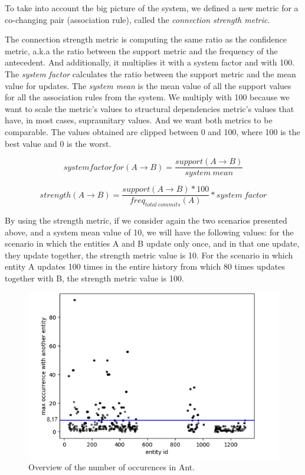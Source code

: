 \documentclass[runningheads]{comsis2}
\begin{document}
To take into account the big picture of the system, we defined a new metric for a co-changing pair (association rule), called the \textit{connection strength metric}. 

The connection strength metric is computing the same ratio as the confidence metric, a.k.a the ratio between the support metric and the frequency of the antecedent. And additionally, it multiplies it with a system factor and with 100. 
The \textit{system factor} calculates the ratio between the support metric and the mean value for updates. The \textit{system mean} is the mean value of all the support values for all the association rules from the system. 
We multiply with 100 because we want to scale the metric's values to structural dependencies metric's values that have, in most cases, supraunitary values. And we want both metrics to be comparable. The values obtained are clipped between 0 and 100, where 100 is the best value and 0 is the worst.



\begin{equation}
 system factor for (A \rightarrow B) =\frac{support (A \rightarrow B) }{system\ mean}
\end{equation}

\begin{equation}
 strength (A \rightarrow B) =\frac{support (A \rightarrow B) * 100}{freq_{total\ commits}(A)} * system\ factor
\end{equation}

By using the strength metric, if we consider again the two scenarios presented above, and a system mean value of 10, we will have the following values: for the scenario in which the entities A and B update only once, and in that one update, they update together, the strength metric value is 10. For the scenario in which entity A updates 100 times in the entire history from which 80 times updates together with B, the strength metric value is 100.  

\begin{figure}
\centering
\includegraphics[scale=0.7]{fig_ant_maxOcc.png}
\caption{Overview of the number of occurences in Ant. }
\label{fig:strength_overview_ant}
\centering
\end{figure}
\end{document}
